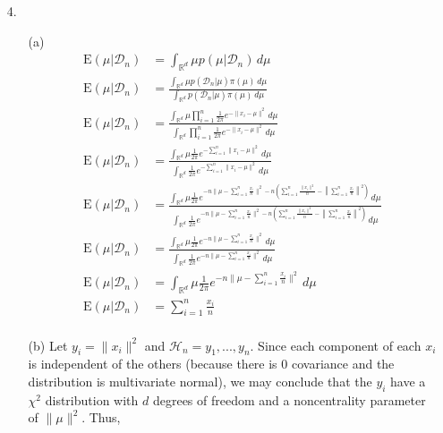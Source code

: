 \documentclass[11pt]{article}
\newcommand{\R}{\mathbb{R}}
\newcommand{\E}{\mathrm{E}}
\theoremstyle{definition}
\begin{document}
\begin{itemize}
\begin{itemize}
        \end{itemize}
    \item[4.]
        \begin{itemize}
            \item[(a)]
                \begin{align*}
                    \E(\mu \vert \mathcal{D}_n) &= \int_{\R^d} \mu  p(\mu \vert \mathcal{D}_n) \, d\mu \\
                    \E(\mu \vert \mathcal{D}_n) &= \frac{\int_{\R^d} \mu  p(\mathcal{D}_n \vert \mu) \pi(\mu) \, d\mu}{\int_{\R^d}p(\mathcal{D}_n \vert \mu) \pi(\mu) \, d\mu} \\
                    \E(\mu \vert \mathcal{D}_n) &= \frac{\int_{\R^d} \mu \prod_{i=1}^n \frac{1}{2\pi}e^{-\|x_i-\mu\|^2}  \, d\mu}{\int_{\R^d}\prod_{i=1}^n\frac{1}{2\pi} e^{-\|x_i-\mu\|^2} \, d\mu}  \\
                    \E(\mu \vert \mathcal{D}_n) &= \frac{\int_{\R^d} \mu \frac{1}{2\pi} e^{-\sum_{i=1}^n\|x_i-\mu\|^2}  \, d\mu}{\int_{\R^d}\frac{1}{2\pi}e^{-\sum_{i=1}^n\|x_i-\mu\|^2} \, d\mu}  \\
                    \E(\mu \vert \mathcal{D}_n) &= \frac{\int_{\R^d} \mu \frac{1}{2\pi} e^{-n\|\mu-\sum_{i=1}^n\frac{x_i}{n}\|^2 -n\left(\sum_{i=1}^n\frac{\|x_i\|^2}{n}-\left\|\sum_{i=1}^n\frac{x_i}{n}\right\|^2\right)}  \, d\mu}{\int_{\R^d}\frac{1}{2\pi}e^{-n\|\mu-\sum_{i=1}^n\frac{x_i}{n}\|^2 -n\left(\sum_{i=1}^n\frac{\|x_i\|^2}{n}-\left\|\sum_{i=1}^n\frac{x_i}{n}\right\|^2\right)} \, d\mu}  \\
                    \E(\mu \vert \mathcal{D}_n) &= \frac{\int_{\R^d} \mu \frac{1}{2\pi} e^{-n\|\mu-\sum_{i=1}^n\frac{x_i}{n}\|^2}  \, d\mu}{\int_{\R^d}\frac{1}{2\pi}e^{-n\|\mu-\sum_{i=1}^n\frac{x_i}{n}\|^2} \, d\mu}  \\
                    \E(\mu \vert \mathcal{D}_n) &= \int_{\R^d} \mu \frac{1}{2\pi} e^{-n\|\mu-\sum_{i=1}^n\frac{x_i}{n}\|^2}  \, d\mu\\
                    \E(\mu \vert \mathcal{D}_n) &= \sum_{i=1}^n\frac{x_i}{n}\\
                \end{align*}
        \item[(b)]
                Let \(y_i=\|x_i\|^2\) and \(\mathcal{H}_n={y_1,...,y_n}\). Since each component of each $x_i$  is independent of the others (because there is $0$ covariance and the distribution is multivariate normal), we may conclude that the $y_i$ have a $\chi^2$ distribution with $d$ degrees of freedom and a noncentrality parameter of $\|\mu\|^2$. Thus,

\end{itemize}
\end{itemize}
\end{document}
